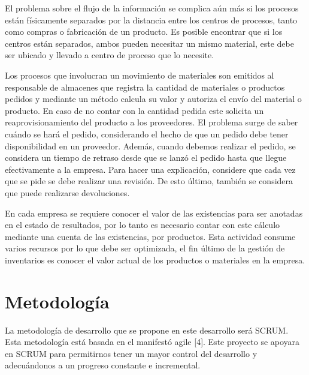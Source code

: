 El problema sobre el flujo de la información se complica aún más si los procesos están físicamente separados por la distancia entre los centros de procesos, tanto como compras o fabricación de un producto. Es posible encontrar que si los centros están separados, ambos pueden necesitar un mismo material, este debe ser ubicado y llevado a centro de proceso que lo necesite.

Los procesos que involucran un movimiento de materiales son emitidos al responsable de almacenes que registra la cantidad de materiales o productos pedidos y mediante un método calcula su valor y autoriza el  envío del material o producto. En caso de no contar con la cantidad pedida este solicita un reaprovisionamiento del producto a los proveedores. El problema surge de saber cuándo se hará el pedido, considerando el hecho de que un pedido debe tener disponibilidad en un proveedor. Además, cuando debemos realizar el pedido, se considera un tiempo de retraso desde que se lanzó el pedido hasta que llegue efectivamente a la empresa. Para hacer una explicación, considere que cada vez que se pide se debe realizar una revisión. De esto último, también se considera que puede realizarse devoluciones.

En cada empresa se requiere conocer el valor de las existencias para ser anotadas en el estado de resultados, por lo tanto es necesario contar con este cálculo mediante una cuenta de las existencias, por productos. Esta actividad consume varios recursos por lo que debe ser optimizada, el fin último de la gestión de inventarios es conocer el valor actual de los productos o materiales en la empresa.

\section{Metodología}

La metodología de desarrollo que se propone en este desarrollo será SCRUM. Esta metodología está basada en el manifestó agile [4]. Este proyecto se apoyara en SCRUM para permitirnos tener un mayor control del desarrollo y adecuándonos a un progreso constante e incremental.


